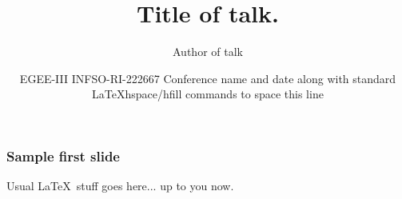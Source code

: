\documentclass{beamer}
\begin{document}
\title{Title of talk.}
\author{Author of talk}
\date{
   {EGEE-III INFSO-RI-222667}  
Conference name and date along with standard \LaTeX hspace/hfill commands to space this line
}
\begin{frame}
\maketitle
\end{frame}


\begin{frame}[fragile]
\frametitle{Sample first slide}
Usual \LaTeX\ stuff goes here... up to you now.
\end{frame}
\end{document}
